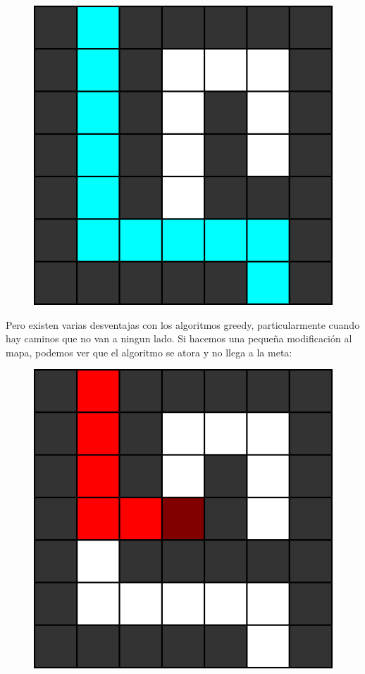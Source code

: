 \documentclass{article}
\begin{document}
\begin{figure}[H]
    \centering
    \includegraphics[width=0.2\paperwidth]{greedybueno}
\end{figure}

Pero existen varias desventajas con los algoritmos greedy, particularmente cuando hay caminos que no van a ningun lado. Si hacemos una pequeña modificación al mapa, podemos ver que el algoritmo se atora y no llega a la meta:

\begin{figure}[H]
    \centering
    \includegraphics[width=0.2\paperwidth]{greedymalo}
\end{figure}
\end{document}
